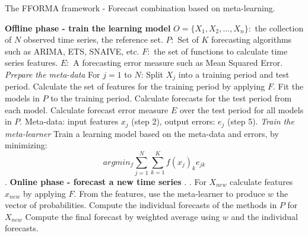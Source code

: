 \documentclass[11pt,a4paper,]{article}
\theoremstyle{definition}
\theoremstyle{definition}
\theoremstyle{definition}
\theoremstyle{remark}
\begin{document}
\begin{algorithm}[!ht]
  \caption{The FFORMA framework - Forecast combination based on meta-learning. }
  \label{alg:algo-lab}
  \begin{algorithmic}[1]
    \Statex \textbf{Offline phase - train the learning model}
    \Statex {}
    \Statex \hspace{1cm}$O=\{X_1, X_2, \dots,X_n\}:$ the collection of $N$ observed time series, the reference set.
      \Statex \hspace{1cm}$P:$ Set of $K$ forecasting algorithms such as ARIMA, ETS, SNAIVE, etc.
         \Statex \hspace{1cm}$F:$ the set of functions to calculate time series features.
         \Statex \hspace{1cm}$E:$ A forecasting error measure such as Mean Squared Error.
     \Statex {}
      \Statex \hspace{1cm}
      \Statex {}
    \Statex \textit{Prepare the meta-data}
    \Statex For $j=1$ to $N$:
            \State Split $X_j$ into a training period and test period.
            \State Calculate the set of features for the training period by applying $F$.
            \State Fit the models in $P$ to the training period.
            \State Calculate forecasts for the test period from each model.
            \State Calculate forecast error measure $E$ over the test period for all models in $P$.
            \State Meta-data: input features $x_j$ (step 2), output errors: $e_j$ (step 5).
     \Statex
    \Statex \textit{Train the meta-learner}
            \State Train a learning model based on the meta-data and errors, by minimizing:
            $$ argmin_f \sum_{j=1}^N \sum_{k=1}^K f(x_j)_k e_{jk}  $$
            .
    \Statex
     \Statex \textbf{Online phase - forecast a new time series}
    \Statex {}
    \Statex \hspace{1cm} .
     \Statex {}
      \Statex \hspace{1cm}.
  \State For $X_{new}$ calculate features $x_{new}$ by applying $F$.
  \State From the features, use the meta-learner to produce $w$ the vector of probabilities. 
  \State Compute the individual forecasts of the methods in $P$ for $X_{new}$
  \State Compute the final forecast by weighted average using $w$ and the individual forecasts.
   \end{algorithmic}

\end{algorithm}
\end{document}
